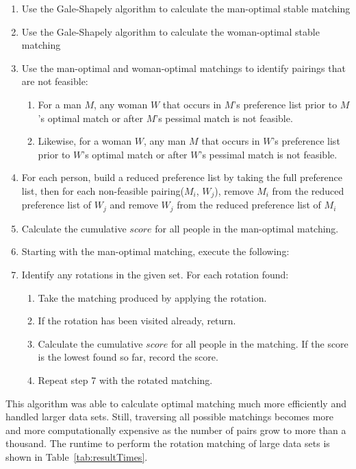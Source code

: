 \documentclass[a4paper]{article}
\begin{document}
\begin{enumerate}
    \item Use the Gale-Shapely algorithm to calculate the man-optimal stable matching
    
    \item Use the Gale-Shapely algorithm to calculate the woman-optimal stable matching
    
    \item Use the man-optimal and woman-optimal matchings to identify pairings that are not feasible:
    \begin{enumerate}
        \item For a man $M$, any woman $W$ that occurs in $M$'s preference list prior to $M$'s optimal match or after $M$'s pessimal match is not feasible.
        \item Likewise, for a woman $W$, any man $M$ that occurs in $W$'s preference list prior to $W$'s optimal match or after $W$'s pessimal match is not feasible.
    \end{enumerate}

    \item For each person, build a reduced preference list by taking the full preference list, then for each non-feasible pairing($M_i$, $W_j$), remove $M_i$ from the reduced preference list of $W_j$ and remove $W_j$ from the reduced preference list of $M_i$

    \item Calculate the cumulative $score$ for all people in the man-optimal matching.

    \item Starting with the man-optimal matching, execute the following:

    \item Identify any rotations in the given set. For each rotation found:
    \begin{enumerate}
        \item Take the matching produced by applying the rotation.
        \item If the rotation has been visited already, return.
        \item Calculate the cumulative $score$ for all people in the matching. If the score is the lowest found so far, record the score.
        \item Repeat step 7 with the rotated matching.
    \end{enumerate}
\end{enumerate}

This algorithm was able to calculate optimal matching much more efficiently and handled larger data sets. Still, traversing all possible matchings becomes more and more computationally expensive as the number of pairs grow to more than a thousand. The runtime to perform the rotation matching of large data sets is shown in Table~\ref{tab:resultTimes}. 
\end{document}
